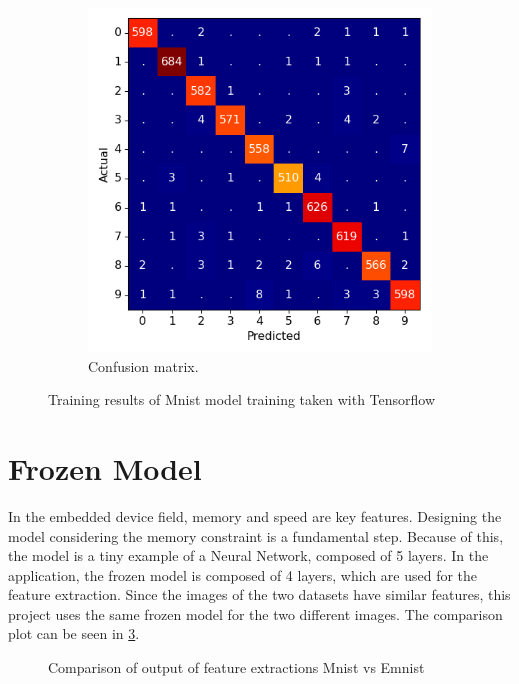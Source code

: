 \begin{figure}[!ht]
\begin{subfigure}[b]{0.4\textwidth}
         \includegraphics[width=\textwidth]{Images/plot_mnist_confusion_matrix.png}
         \caption{Confusion matrix.}
         \label{fig:confusion_matrix}
     \end{subfigure}
        \caption{Training results of Mnist model training taken with Tensorflow}
        \label{training_results}
\end{figure}

\section{Frozen Model}
\label{sec:frozen_model}

\quad In the embedded device field, memory and speed are key features. Designing the model considering the memory constraint is a fundamental step. Because of this, the model is a tiny example of a Neural Network, composed of 5 layers. In the application, the frozen model is composed of 4 layers, which are used for the feature extraction. Since the images of the two datasets have similar features, this project uses the same frozen model for the two different images. The comparison plot can be seen in \ref{comparison_frozen_model}. 

\begin{figure}[!ht]
\centerline{}
\caption{Comparison of output of feature extractions Mnist vs Emnist}
\label{comparison_frozen_model}
\end{figure}

